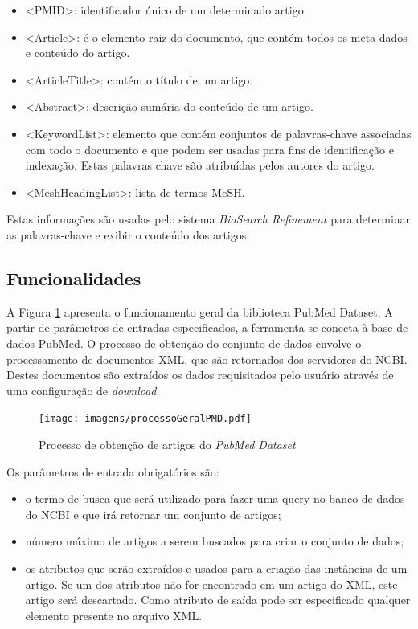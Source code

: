 \begin{itemize}
    \item <PMID>: identificador único de um determinado artigo
    \item <Article>:  é o elemento raiz do documento, que contém todos os meta-dados e conteúdo do artigo.
    \item <ArticleTitle>:  contém o título de um artigo.
    \item <Abstract>:  descrição sumária do conteúdo de um artigo.
    \item <KeywordList>:  elemento que contém conjuntos de palavras-chave associadas com todo o documento e que podem ser usadas para fins de identificação e indexação. Estas palavras chave são atribuídas pelos autores do artigo.
    \item <MeshHeadingList>: lista de termos MeSH.
\end{itemize}
Estas informações são usadas pelo sistema \emph{BioSearch Refinement} para determinar as palavras-chave e exibir o conteúdo dos artigos.

\subsection{Funcionalidades}
A Figura \ref{fig:processoGeralPMD} apresenta o funcionamento geral da biblioteca PubMed Dataset. A partir de parâmetros de entradas especificados, a ferramenta se conecta à base de dados PubMed. O processo de obtenção do conjunto de dados envolve o processamento de documentos XML, que são retornados dos servidores do NCBI. Destes documentos são extraídos os dados requisitados pelo usuário através de uma configuração de \emph{download}.

\begin{figure}[h!]
    \center    
    \texttt{[image: imagens/processoGeralPMD.pdf]}
    \caption{Processo de obtenção de artigos do \emph{PubMed Dataset}\label{fig:processoGeralPMD}}
\end{figure}

Os parâmetros de entrada obrigatórios são:
\begin{itemize}
    \item o termo de busca que será utilizado para fazer uma query no banco de dados do
NCBI e que irá retornar um conjunto de artigos;
    \item número máximo de artigos a serem buscados para criar o conjunto de dados;
    \item os atributos que serão extraídos e usados para a criação das instâncias de um artigo.
Se um dos atributos não for encontrado em um artigo do XML, este artigo será
descartado. Como atributo de saída pode ser especificado qualquer elemento
presente no arquivo XML.
\end{itemize}

